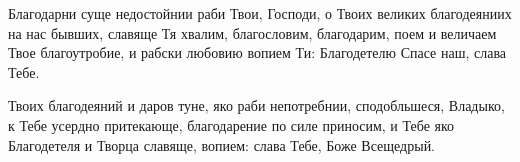 \mychapterending

\begin{mymulticols}



Благодарни суще недостойнии раби Твои, Господи, о Твоих великих благодеяниих на нас бывших, славяще Тя хвалим, благословим, благодарим, поем и величаем Твое благоутробие, и рабски любовию вопием Ти: Благодетелю Спасе наш, слава Тебе.


Твоих благодеяний и даров туне, яко раби непотребнии, сподобльшеся, Владыко, к Тебе усердно притекающе, благодарение по силе приносим, и Тебе яко Благодетеля и Творца славяще, вопием: слава Тебе, Боже Всещедрый.

\slavainynen


\end{mymulticols}

\mychapterending


